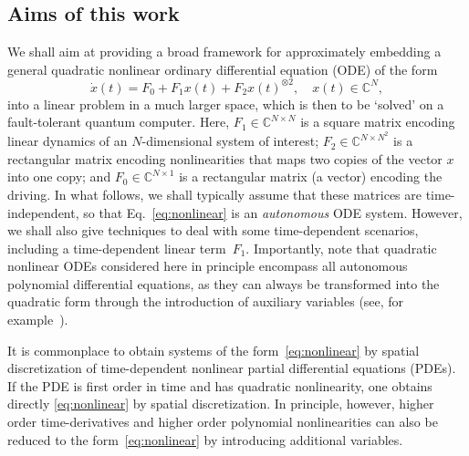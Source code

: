 \documentclass[superscriptaddress,onecolumn,nofootinbib,longbibliography,a4paper,accepted=2026-09-29]{quantumarticle}
\theoremstyle{plain}
\theoremstyle{definition}
\numberwithin{thm}{section}
\numberwithin{assumption}{section}
\numberwithin{lemma}{section}
\numberwithin{prop}{section}
\numberwithin{cor}{section}
\numberwithin{definition}{section}
\numberwithin{rmk}{section}
\numberwithin{equation}{section}
\begin{document}

\subsection{Aims of this work}

We shall aim at providing a broad framework for approximately embedding a general quadratic nonlinear ordinary differential equation (ODE) of the form
\begin{equation}
\label{eq:nonlinear}
    \dot{x}(t) = F_0 + F_1 x(t) + F_2 x(t)^{\otimes 2}, \quad x(t) \in \mathbb{C}^N,
\end{equation}
into a linear problem in a much larger space, which is then to be `solved' on a fault-tolerant quantum computer. Here, $F_1 \in \mathbb{C}^{N\times N}$ is a square matrix encoding linear dynamics of an $N$-dimensional system of interest; $F_2 \in \mathbb{C}^{N\times N^2}$ is a rectangular matrix encoding nonlinearities that maps two copies of the vector $x$ into one copy; and $F_0 \in \mathbb{C}^{N\times 1}$ is a rectangular matrix (a vector) encoding the driving. In what follows, we shall typically assume that these matrices are time-independent, so that Eq.~\eqref{eq:nonlinear} is an \emph{autonomous} ODE system. However, we shall also give techniques to deal with some time-dependent scenarios, including a time-dependent linear term~$F_1$. Importantly, note that quadratic nonlinear ODEs considered here in principle encompass all autonomous polynomial differential equations, as they can always be transformed into the quadratic form through the introduction of auxiliary variables (see, for example~\cite{kerner1981universal}). 

It is commonplace to obtain systems of the form~\eqref{eq:nonlinear} by spatial discretization of time-dependent nonlinear partial differential equations (PDEs). If the PDE is first order in time and has quadratic nonlinearity, one obtains directly \eqref{eq:nonlinear} by spatial discretization. In principle, however, higher order time-derivatives and higher order polynomial nonlinearities can also be reduced to the form~\eqref{eq:nonlinear} by introducing additional variables. 
\end{document}

